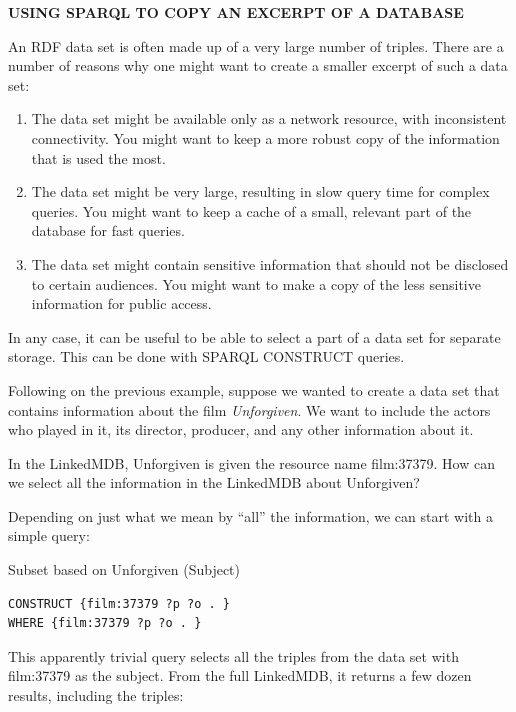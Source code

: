 \begin{challenge}
\textbf{USING SPARQL TO COPY AN EXCERPT OF A DATABASE}
\label{chal:4}

An RDF data set is often made up of a very large number of triples.
There are a number of reasons why one might want to create a smaller
excerpt of such a data set:

\begin{enumerate}
\item  The data set might be available only as a network resource, with
inconsistent connectivity. You might want to keep a more robust copy of
the information that is used the most.

\item  The data set might be very large, resulting in slow query time for
complex queries. You might want to keep a cache of a small, relevant
part of the database for fast queries.

\item  The data set might contain sensitive information that should not be
disclosed to certain audiences. You might want to make a copy of the less sensitive information for public access.
\end{enumerate}


In any case, it can be useful to be able to select a part of a data set
for separate storage. This can be done with
SPARQL CONSTRUCT queries.

Following on the previous example, suppose we wanted to create a data
set that contains information about the film \emph{Unforgiven}. We want
to include the actors who played in it, its director, producer, and any
other information about it.

In the LinkedMDB, Unforgiven is given the resource name film:37379. How
can we select all the information in the LinkedMDB about Unforgiven?

Depending on just what we mean by ``all'' the information, we can start
with a simple query:

\begin{query}Subset based on Unforgiven (Subject)\end{query}
\begin{lstlisting}
CONSTRUCT {film:37379 ?p ?o . } 
WHERE {film:37379 ?p ?o . }
\end{lstlisting}

This apparently trivial query selects all the triples from the data set
with film:37379 as the subject. From the full LinkedMDB, it returns a
few dozen results, including the triples:


\end{challenge}
